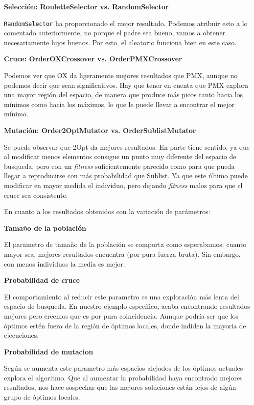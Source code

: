 \documentclass[a4paper,12pt,titlepage]{article}
\begin{document}
\textbf{Selección: RouletteSelector vs. RandomSelector}

\lstinline|RandomSelector| ha proporcionado el mejor resultado. Podemos atribuir esto a lo comentado anteriormente, no porque el padre sea bueno, vamos a obtener necesariamente hijos buenos. Por esto, el aleatorio funciona bien en este caso.

\textbf{Cruce: OrderOXCrossover vs. OrderPMXCrossover}

Podemos ver que OX da ligeramente mejores resultados que PMX, aunque no podemos decir que sean significativos. Hay que tener en cuenta que PMX explora una mayor región del espacio, de manera que produce más picos tanto hacia los mínimos como hacia los máximos, lo que le puede llevar a encontrar el mejor mínimo.

\textbf{Mutación: Order2OptMutator vs. OrderSublistMutator}

Se puede observar que 2Opt da mejores resultados. En parte tiene sentido, ya que al modificar menos elementos consigue un punto muy diferente del espacio de busqueda, pero con un \textit{fitness} suficientemente parecido como para que pueda llegar a reproducirse con más probabilidad que Sublist. Ya que este último puede modificar en mayor medida el individuo, pero dejando \textit{fitness} malos para que el cruce sea consistente.
	 
En cuanto a los resultados obtenidos con la variación de parámetros:

\textbf{Tamaño de la población}

El parametro de tamaño de la población se comporta como esperabamos: cuanto mayor sea, mejores resultados encuentra (por pura fuerza bruta). Sin embargo, con menos individuos la media es mejor.
	 
\textbf{Probabilidad de cruce}

El comportamiento al reducir este parametro es una exploración más lenta del espacio de busqueda. En nuestro ejemplo específico, acaba encontrando resultados mejores pero creemos que es por pura coincidencia. Aunque podría ser que los óptimos estén fuera de la región de óptimos locales, donde indiden la mayoria de ejecuciones.
	 
\textbf{Probabilidad de mutacion}
	 
Según se aumenta este parametro más espacios alejados de los óptimos actuales explora el algoritmo. Que al aumentar la probabilidad haya encontrado mejores resultados, nos hace sospechar que las mejores soluciones están lejos de algún grupo de óptimos locales.
\end{document}
